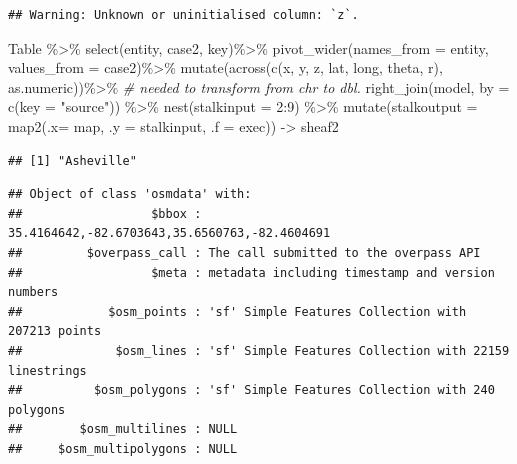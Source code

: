 \documentclass[
]{article}
\newenvironment{Shaded}{\begin{snugshade}}{\end{snugshade}}
\newcommand{\AttributeTok}[1]{\textcolor[rgb]{0.77,0.63,0.00}{#1}}
\newcommand{\CommentTok}[1]{\textcolor[rgb]{0.56,0.35,0.01}{\textit{#1}}}
\newcommand{\DecValTok}[1]{\textcolor[rgb]{0.00,0.00,0.81}{#1}}
\newcommand{\FunctionTok}[1]{\textcolor[rgb]{0.00,0.00,0.00}{#1}}
\newcommand{\NormalTok}[1]{#1}
\newcommand{\OtherTok}[1]{\textcolor[rgb]{0.56,0.35,0.01}{#1}}
\newcommand{\SpecialCharTok}[1]{\textcolor[rgb]{0.00,0.00,0.00}{#1}}
\newcommand{\StringTok}[1]{\textcolor[rgb]{0.31,0.60,0.02}{#1}}
\begin{document}
\begin{verbatim}
## Warning: Unknown or uninitialised column: `z`.
\end{verbatim}

\begin{Shaded}
\begin{Highlighting}[]
\NormalTok{Table }\SpecialCharTok{\%\textgreater{}\%}
  \FunctionTok{select}\NormalTok{(entity, case2, key)}\SpecialCharTok{\%\textgreater{}\%}
  \FunctionTok{pivot\_wider}\NormalTok{(}\AttributeTok{names\_from =}\NormalTok{ entity, }\AttributeTok{values\_from =}\NormalTok{ case2)}\SpecialCharTok{\%\textgreater{}\%}
  \FunctionTok{mutate}\NormalTok{(}\FunctionTok{across}\NormalTok{(}\FunctionTok{c}\NormalTok{(x, y, z, lat, long, theta, r), as.numeric))}\SpecialCharTok{\%\textgreater{}\%} \CommentTok{\# needed to transform from chr to dbl. }
  \FunctionTok{right\_join}\NormalTok{(model, }\AttributeTok{by =} \FunctionTok{c}\NormalTok{(}\AttributeTok{key =} \StringTok{"source"}\NormalTok{)) }\SpecialCharTok{\%\textgreater{}\%}
  \FunctionTok{nest}\NormalTok{(}\AttributeTok{stalkinput =} \DecValTok{2}\SpecialCharTok{:}\DecValTok{9}\NormalTok{) }\SpecialCharTok{\%\textgreater{}\%}
  \FunctionTok{mutate}\NormalTok{(}\AttributeTok{stalkoutput =} \FunctionTok{map2}\NormalTok{(}\AttributeTok{.x=}\NormalTok{ map, }\AttributeTok{.y =}\NormalTok{ stalkinput, }\AttributeTok{.f =}\NormalTok{ exec)) }\OtherTok{{-}\textgreater{}}\NormalTok{ sheaf2}
\end{Highlighting}
\end{Shaded}

\begin{verbatim}
## [1] "Asheville"
\end{verbatim}

\begin{verbatim}
## Object of class 'osmdata' with:
##                  $bbox : 35.4164642,-82.6703643,35.6560763,-82.4604691
##         $overpass_call : The call submitted to the overpass API
##                  $meta : metadata including timestamp and version numbers
##            $osm_points : 'sf' Simple Features Collection with 207213 points
##             $osm_lines : 'sf' Simple Features Collection with 22159 linestrings
##          $osm_polygons : 'sf' Simple Features Collection with 240 polygons
##        $osm_multilines : NULL
##     $osm_multipolygons : NULL
\end{verbatim}
\end{document}
